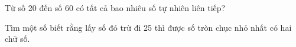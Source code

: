 \begin{ex} %
Từ số 20 đến số 60 có tất cả bao nhiêu số tự nhiên liên tiếp?
\end{ex}

\begin{ex} %
Tìm một số biết rằng lấy số đó trừ đi 25 thì được số tròn chục nhỏ nhất có hai chữ số.
\end{ex}
